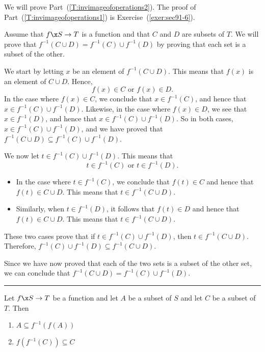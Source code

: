 %
\begin{myproof}
We will prove Part~(\ref{T:invimageofoperations2}).  The proof of 
Part~(\ref{T:invimageofoperations1}) is Exercise~(\ref{exer:sec91-6}).

Assume that $f\x S \to T$ is a function and that $C$ and $D$ are subsets of $T$.  We will prove that $f^{-1} ( C \cup D ) = f^{-1} ( C ) \cup f^{-1} ( D )$ by proving that each set is a subset of the other.

We start by letting $x$ be an element of $f^{-1} ( C \cup D )$.  This means that 
$f ( x )$ is an element of $C \cup D$.  Hence,
\[
f ( x ) \in C \text{ or } f ( x ) \in D.
\]
In the case where $f ( x ) \in C$, we conclude that $x \in f^{-1} ( C )$, and hence that $x \in f^{-1} ( C ) \cup f^{-1} ( D )$.  Likewise, in the case where $f ( x ) \in D$, we see that $x \in f^{-1} ( D )$, and hence that 
$x \in f^{-1} ( C ) \cup f^{-1} ( D )$.  So in both cases, 
$x \in f^{-1} ( C ) \cup f^{-1} ( D )$, and we have proved that 
$f^{-1} ( C \cup D ) \subseteq f^{-1} ( C ) \cup f^{-1} ( D )$.

We now let $t \in f^{-1} ( C ) \cup f^{-1} ( D )$.  This means that
\[
t \in f^{-1} ( C ) \text{ or } t \in f^{-1} ( D ).
\]
\begin{itemize}
\item In the case where $t \in f^{-1} ( C )$, we conclude that 
$f ( t ) \in C$ and hence that $f ( t ) \in C \cup D$.  This means that 
$t \in f^{-1} ( C \cup D )$.

\item Similarly, when $t \in f^{-1} ( D )$, it follows that 
$f ( t ) \in D$ and hence that $f ( t ) \in C \cup D$.  This means that 
$t \in f^{-1} ( C \cup D )$.
\end{itemize}

These two cases prove that if $t \in f^{-1} ( C ) \cup f^{-1} ( D )$, then 
$t \in f^{-1} ( C \cup D )$.  Therefore, 
$f^{-1} ( C ) \cup f^{-1} ( D ) \subseteq f^{-1} ( C \cup D )$.

Since we have now proved that each of the two sets is a subset of the other set, we can conclude that $f^{-1} ( C \cup D ) = f^{-1} ( C ) \cup f^{-1} ( D )$.
\end{myproof}
\hrule
%
\begin{theorem} \label{T:imageofinvimage}
Let $f\x S \to T$ be a function and let $A$ be a subset of $S$ and let $C$ be a subset of $T$.  Then
\begin{multicols}{2}
\begin{enumerate}
\item $A \subseteq f^{-1} \!\left( f ( A ) \right)$
\label{T:imageofinvimage1}

\item $f \!\left( f^{-1} ( C ) \right) \subseteq C$
\label{T:imageofinvimage2}
\end{enumerate}
\end{multicols}
\end{theorem}
